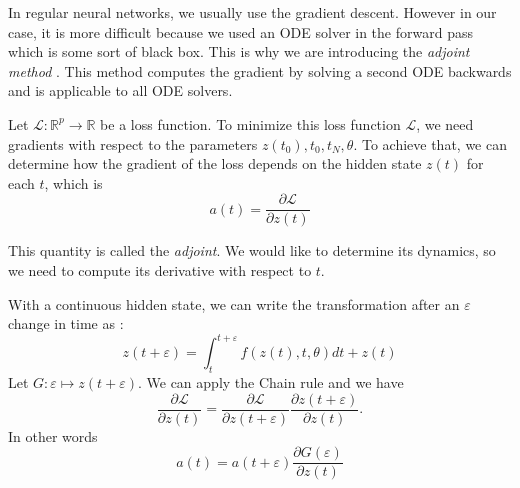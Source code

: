 \documentclass[10pt,a4paper]{article}
\theoremstyle{definition}
\theoremstyle{definition}
\theoremstyle{definition}
\begin{document}
In regular neural networks, we usually use the gradient descent. However in our case, it is more difficult because we used an ODE solver in the forward pass which is some sort of black box. This is why we are introducing the \textit{adjoint method} \cite{1}. This method computes the gradient by solving a second ODE backwards and is applicable to all ODE solvers.

Let $\mathcal{L} : \mathbb{R}^p \rightarrow \mathbb{R}$ be a loss function. To minimize this loss function $\mathcal{L}$, we need gradients with respect to the parameters $z(t_0),t_0,t_N,\theta$. To achieve that, we can determine how the gradient of the loss depends on the hidden state $z(t)$ for each $t$, which is
\begin{equation}
a(t)= \frac{\partial \mathcal{L}}{\partial z(t)}
\end{equation}

This quantity is called the \textit{adjoint}. We would like to determine its dynamics, so we need to compute its derivative with respect to $t$.

With a continuous hidden state, we can write the transformation after an $\varepsilon$ change in time as :
\begin{equation}
\label{zteps}
z(t+\varepsilon) = \int^{t+\varepsilon}_{t} f(z(t),t,\theta) dt + z(t)
\end{equation}
Let $ G : \varepsilon \mapsto z(t+\varepsilon)$. We can apply the Chain rule and we have 
\begin{equation*}
\frac{\partial \mathcal{L}}{\partial z(t)} = \frac{\partial \mathcal{L}}{\partial z(t+\varepsilon)} \frac{\partial z(t+\varepsilon)}{\partial z(t)}.
\end{equation*}
In other words 
\begin{equation}
\label{at}
a(t) = a(t+\varepsilon)\frac{\partial G(\varepsilon)}{\partial z(t)}
\end{equation}
\end{document}
